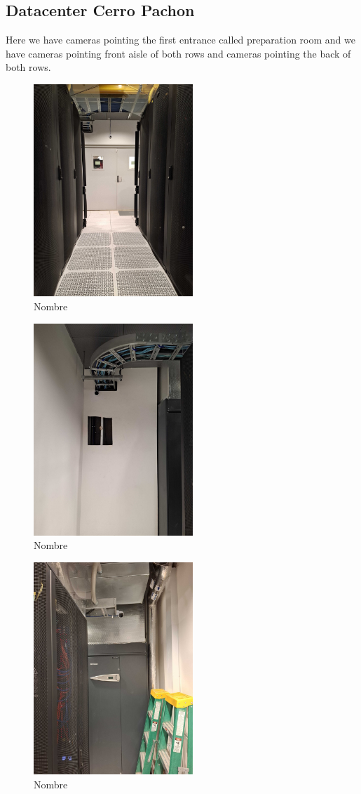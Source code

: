 \subsection{Datacenter Cerro Pachon}

Here we have cameras pointing the first entrance called preparation room and we have cameras pointing front aisle of both rows and cameras pointing the back of both rows.

\begin{figure}
    \includegraphics[width=6cm]{10.jpg}
    \centering
    \caption*{Nombre}
  \end{figure}
  \begin{figure}
    \includegraphics[width=6cm]{11.jpg}
    \centering
    \caption*{Nombre}
  \end{figure}
  \begin{figure}
    \includegraphics[width=6cm]{22.jpg}
    \centering
    \caption*{Nombre}
  \end{figure}

